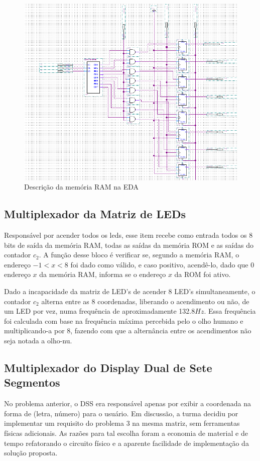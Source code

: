 \documentclass[12pt]{article}
\begin{document}
\begin{figure}[!htbp]
\centering
\includegraphics[width=.6\textwidth]{img/ram-eda.png}
\caption{Descrição da memória RAM na EDA}
\label{fig:ram-eda}
\end{figure}

\subsection{Multiplexador da Matriz de LEDs}
Responsável por acender todos os leds, esse item recebe como entrada todos os 8 bits de saída da memória RAM, todas as saídas da memória ROM e as saídas do contador $c_{2}$. A função desse bloco é verificar se, segundo a memória RAM, o endereço $-1<x<8$ foi dado como válido, e caso positivo, acendê-lo, dado que 0 endereço $x$ da memória RAM, informa se o endereço $x$ da ROM foi ativo.

Dado a incapacidade da matriz de LED's de acender 8 LED's simultaneamente, o contador $c_{2}$ alterna entre as 8 coordenadas, liberando o acendimento ou não, de um LED por vez, numa frequência de aproximadamente 132.8$Hz$. Essa frequência foi calculada com base na frequência máxima percebida pelo o olho humano e multiplicando-a por 8, fazendo com que a alternância entre os acendimentos não seja notada a olho-nu.


\subsection{Multiplexador do Display Dual de Sete Segmentos} \label{sub:mux-matriz}

No problema anterior, o DSS era responsável apenas por exibir a coordenada na forma de (letra, número) para o usuário. Em discussão, a turma decidiu por implementar um requisito do problema 3 na mesma matriz, sem ferramentas físicas adicionais. As razões para tal escolha foram a economia de material e de tempo refatorando o circuito físico e a aparente facilidade de implementação da solução proposta.
\end{document}
